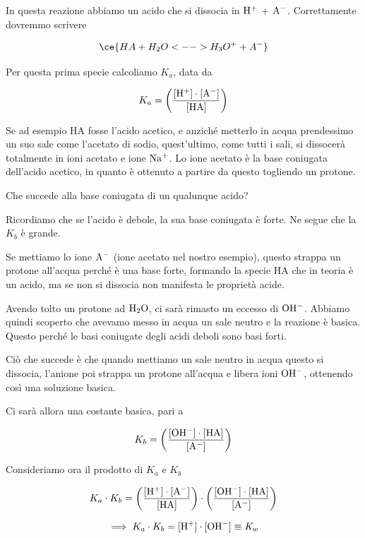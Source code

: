 
In questa reazione abbiamo un acido che si dissocia in $\rm H^+$ + $\rm A^-$. Correttamente dovremmo scrivere

$$\ce{HA + H_2O <--> H_3O^+ + A^-}$$

Per questa prima specie calcoliamo $K_a$, data da

$$K_a = \left( \rm \frac{[H^+] \cdot [A^-]}{[HA]} \right)$$

Se ad esempio HA fosse l'acido acetico, e anziché metterlo in acqua prendessimo un suo sale come l'acetato di sodio, quest'ultimo, come tutti i sali, si dissocerà totalmente in ioni acetato e ione $\rm Na^+$. Lo ione acetato è la base coniugata dell'acido acetico, in quanto è ottenuto a partire da questo togliendo un protone.

Che succede alla base coniugata di un qualunque acido?

Ricordiamo che se l'acido è debole, la sua base coniugata è forte. Ne segue che la $K_b$ è grande.

\vspace{0.2cm}

\vspace{0.2cm}Se mettiamo lo ione $\rm A^-$ (ione acetato nel nostro esempio), questo strappa un protone all'acqua perché è una base forte, formando la specie HA che in teoria è un acido, ma se non si dissocia non manifesta le proprietà acide.

Avendo tolto un protone ad $\rm H_2O$, ci sarà rimasto un eccesso di $\rm OH^-$. Abbiamo quindi scoperto che avevamo messo in acqua un sale neutro e la reazione è basica. Questo perché le basi coniugate degli acidi deboli sono basi forti.

Ciò che succede è che quando mettiamo un sale neutro in acqua questo si dissocia, l'anione poi strappa un protone all'acqua e libera ioni $\rm OH^-$, ottenendo così una soluzione basica.

Ci sarà allora una costante basica, pari a

$$K_b = \left( \rm \frac{[OH^-] \cdot [HA]}{[A^-]} \right)$$

Consideriamo ora il prodotto di $K_a$ e $K_b$

$$K_a \cdot K_b = \left( \rm \frac{[H^+] \cdot [A^-]}{[HA]} \right) \cdot \left( \rm \frac{[OH^-] \cdot [HA]}{[A^-]} \right)$$

$$\implies K_a \cdot K_b = \rm [H^+] \cdot [OH^-] \equiv \textit{K}_\textit{w}$$

